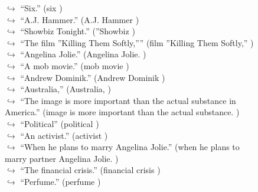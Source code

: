 \documentclass[11pt,a4paper, onecolumn]{article}
\begin{document}
\begin{figure}[t] \small \begin{tcolorbox}[boxsep=0pt,left=5pt,right=0pt,top=2pt,colback = yellow!5] \begin{dialogue}
 \small 
\colorbox{pink!25}{$\hookrightarrow$}
{ ``Six.'' (six ) }
\\
\colorbox{pink!25}{$\hookrightarrow$}
{ ``A.J. Hammer.'' (A.J. Hammer ) }
\\
\colorbox{pink!25}{$\hookrightarrow$}
{ ``Showbiz Tonight.'' (''Showbiz ) }
\\
\colorbox{pink!25}{$\hookrightarrow$}
{ ``The film ''Killing Them Softly,'''' (film ''Killing Them Softly,'' ) }
\\
\colorbox{pink!25}{$\hookrightarrow$}
{ ``Angelina Jolie.'' (Angelina Jolie. ) }
\\
\colorbox{pink!25}{$\hookrightarrow$}
{ ``A mob movie.'' (mob movie ) }
\\
\colorbox{pink!25}{$\hookrightarrow$}
{ ``Andrew Dominik.'' (Andrew Dominik ) }
\\
\colorbox{pink!25}{$\hookrightarrow$}
{ ``Australia,'' (Australia, ) }
\\
\colorbox{pink!25}{$\hookrightarrow$}
{ ``The image is more important than the actual substance in America.'' (image is more important than the actual substance. ) }
\\
\colorbox{pink!25}{$\hookrightarrow$}
{ ``Political'' (political ) }
\\
\colorbox{pink!25}{$\hookrightarrow$}
{ ``An activist.'' (activist ) }
\\
\colorbox{pink!25}{$\hookrightarrow$}
{ ``When he plans to marry Angelina Jolie.'' (when he plans to marry partner Angelina Jolie. ) }
\\
\colorbox{pink!25}{$\hookrightarrow$}
{ ``The financial crisis.'' (financial crisis ) }
\\
\colorbox{pink!25}{$\hookrightarrow$}
{ ``Perfume.'' (perfume ) }
\\
 \end{dialogue}\end{tcolorbox}\end{figure}
\end{document}
